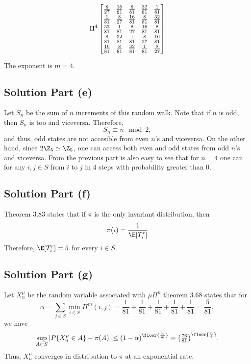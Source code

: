\[ \arraycolsep=4pt\def\arraystretch{1.2}
\Pi^4\left[\begin{matrix}\frac{8}{27} & \frac{16}{81} & \frac{8}{81} & \frac{32}{81} & \frac{1}{81}\\\frac{1}{81} & \frac{8}{27} & \frac{16}{81} & \frac{8}{81} & \frac{32}{81}\\\frac{32}{81} & \frac{1}{81} & \frac{8}{27} & \frac{16}{81} & \frac{8}{81}\\\frac{8}{81} & \frac{32}{81} & \frac{1}{81} & \frac{8}{27} & \frac{16}{81}\\\frac{16}{81} & \frac{8}{81} & \frac{32}{81} & \frac{1}{81} & \frac{8}{27}\end{matrix}\right]   \]

The exponent is $m = 4$.

\subsection*{Solution Part (e)}

Let $S_n$ be the sum of $n$ increments of this random walk. Note that if $n$ is odd, then $S_n$ is too and viceversa. Therefore,
\[ S_n \equiv n \mod 2, \]
and thus, odd states are not accesible from even $n$'s and viceversa. On the other hand, since $2\Z_5 \simeq \Z_5$, one can access both even and odd states from odd $n$'s and viceversa. From the previous part is also easy to see that for $n = 4$ one can for any $i,j\in S$ from $i$ to $j$ in 4 steps with probability greater than 0.

\subsection*{Solution Part (f)}

Theorem 3.83 states that if $\pi$ is the only invariant distribution, then
\[ \pi(i) = \frac{1}{\E[T_i^r]} \]
Therefore, $\E[T_i^r] = 5$ for every $i\in S$.

\subsection*{Solution Part (g)}
Let $X_n^\mu$ be the random variable associated with $\mu\Pi^n$
theorem 3.68 states that for
\[ \alpha = \sum_{j\in S} \min_{i\in S} \Pi^m(i,j) = \frac{1}{81}+\frac{1}{81}+\frac{1}{81}+\frac{1}{81}+\frac{1}{81} = \frac{5}{81}, \]
we have
\[ \sup_{A\subset S} |P\{X_n^\mu \in A\} - \pi(A)| \leq {(1-\alpha)}^{\floor{\frac{n}{m}}} = {\left( \tfrac{76}{81} \right)}^{\floor{\frac{n}{4}}}. \]
Thus, $X_n^\mu$ converges in distribution to $\pi$ at an exponential rate.
